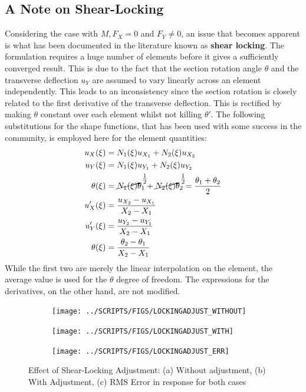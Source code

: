 \documentclass[10pt]{article}
\begin{document}
\subsection{A Note on Shear-Locking}
\label{sec:note-shear-locking}

Considering the case with $M, F_X=0$ and $F_Y\neq 0$, an issue
that becomes apparent is what has been documented in the literature
known as \textbf{shear locking}. The formulation requires a huge
number of elements before it gives a sufficiently converged
result. This is due to the fact that the section rotation angle
$\theta$ and the transverse deflection $u_Y$ are assumed to vary
linearly across an element independently. This leads to an
inconsistency since the section rotation is closely related to the
first derivative of the transverse deflection. This is rectified by
making $\theta$ constant over each element whilst not killing
$\theta'$. The following substitutions for the shape functions, that
has been used with some success in the community, is employed here for
the element quantities:
\begin{align}
  u_X(\xi) &= N_1(\xi)u_{X_1} + N_2(\xi)u_{X_2}\\
  u_Y(\xi) &= N_1(\xi)u_{Y_1} + N_2(\xi)u_{Y_2}\\
  \theta(\xi) &= \cancelto{\frac{1}{2}}{N_1(\xi)}\theta_1 +
                \cancelto{\frac{1}{2}}{N_2(\xi)}\theta_2 =
                \frac{\theta_1 + \theta_2}{2}\\
  u_X'(\xi) &= \frac{u_{X_2}-u_{X_1}}{X_2-X_1}\\
  u_Y'(\xi) &= \frac{u_{Y_2}-u_{Y_1}}{X_2-X_1}\\
  \theta(\xi) &= \frac{\theta_2-\theta_1}{X_2-X_1}
  \label{eq:sla}
\end{align}
While the first two are merely the linear interpolation on the
element, the average value is used for the $\theta$ degree of
freedom. The expressions for the derivatives, on the other hand, are
not modified.

\begin{figure}[!h]
  \centering
  \begin{subfigure}[!h]{0.33\linewidth}
    \centering
    \texttt{[image: ../SCRIPTS/FIGS/LOCKINGADJUST\_WITHOUT]}
    \caption{}
  \end{subfigure}%
  \begin{subfigure}[!h]{0.33\linewidth}
    \centering
    \texttt{[image: ../SCRIPTS/FIGS/LOCKINGADJUST\_WITH]}
    \caption{}
  \end{subfigure}%
  \begin{subfigure}[!h]{0.33\linewidth}
    \centering
    \texttt{[image: ../SCRIPTS/FIGS/LOCKINGADJUST\_ERR]}
    \caption{}
  \end{subfigure}
  \caption{Effect of Shear-Locking Adjustment: (a) Without adjustment,
  (b) With Adjustment, (c) RMS Error in response for both cases}
  \label{fig:sla}
\end{figure}
\end{document}
